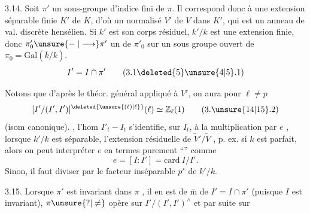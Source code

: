 3.14. Soit \(\pi'\) un sous-groupe d'indice fini de \(\pi\). Il correspond donc à une extension séparable finie \(K'\) de \(K\), d'où un normalisé \(V'\) de \(V\) dans \(K'\), qui est un anneau de val. discrète hensélien. Si \(k'\) est son corps résiduel, \(k'/k\) est une extension finie, donc \(\pi'_0\unsure{\mathrel{-}|\longrightarrow}\pi'\)   un  de \(\pi'_0\) sur un sous groupe ouvert de \(\pi_0=\mathrm{Gal}(\bar k/k)\).    
\[
 I'=I\cap\pi' \tag*{(3.1\deleted{5}\unsure{4|5}.1)}
\]

Notons que d'après le théor. général appliqué à \(V'\), on aura pour   \(\ell\ne p\)
\[
 [I'/(I',I')]^{\deleted{\unsure{(\ell)|\ell}}}(\ell)\simeq\mathbb Z_\ell(1) \tag*{(3.\unsure{14|15}.2)}
\]
(isom canonique). , l'hom \(I'_t\mathrel{-}I_t\) s'identifie, sur \(I_t\), à la multiplication par \(e\) ,  lorsque \(k'/k\) est séparable,   l'extension résiduelle de \(\widetilde V'/\widetilde V\)  ,  p. ex. si \(k\) est parfait, alors on peut interpréter \(e\) en termes purement ``'' comme
\[
 e=[I:I']=\mathrm{card}\ I/I'.
\]
Sinon, il faut diviser par le facteur inséparable \(p^s\) de \(k'/k\).


3.15. Lorsque \(\pi'\) est invariant dans \(\pi\) , il en est de \(\overline{\mathrm m}\) de  \(I'=I\cap\pi'\)  (puisque \(I\) est invariant),   \(\pi\unsure{?|\ne}\) opère sur \(I'/(I',I')^\wedge\) et par suite sur

